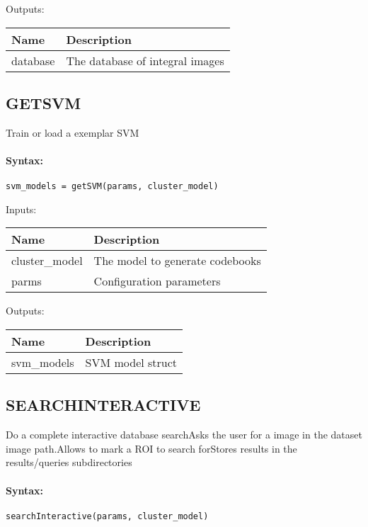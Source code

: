 \bigskip
Outputs:

\begin{tabular}{|p{}|p{}|}
\hline
\textbf{Name} & \textbf{Description} \\
\hline \hline
database & The database of integral images  \\ \hline
\end{tabular}

\subsection{GETSVM}

Train or load a exemplar SVM

\paragraph{Syntax:} \verb|svm_models = getSVM(params, cluster_model)|

\bigskip
Inputs:

\begin{tabular}{|p{}|p{}|}
\hline
\textbf{Name} & \textbf{Description} \\
\hline \hline
cluster\_model & The model to generate codebooks  \\ \hline
parms & Configuration parameters  \\ \hline
\end{tabular}

\bigskip
Outputs:

\begin{tabular}{|p{}|p{}|}
\hline
\textbf{Name} & \textbf{Description} \\
\hline \hline
svm\_models & SVM model struct  \\ \hline
\end{tabular}

\subsection{SEARCHINTERACTIVE}

Do a complete interactive database searchAsks the user for a image in the dataset image path.Allows to mark a ROI to search forStores results in the results/queries subdirectories

\paragraph{Syntax:} \verb|searchInteractive(params, cluster_model)|

